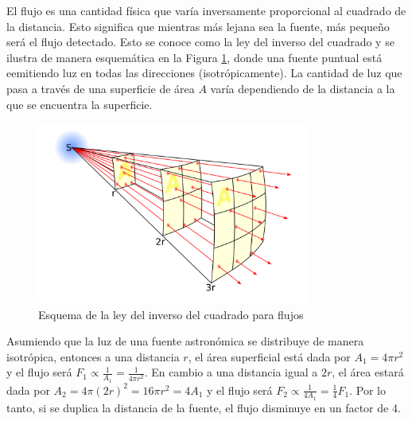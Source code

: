 El flujo es una cantidad física que varía inversamente proporcional al cuadrado de la distancia. Esto significa que mientras más lejana sea la fuente, más pequeño será el flujo detectado. Esto se conoce como la ley del inverso del cuadrado y se ilustra de manera esquemática en la Figura \ref{fig:flux-inverse}, donde una fuente puntual está eemitiendo luz en todas las direcciones (isotrópicamente). La cantidad de luz que pasa a través de una superficie de área $A$ varía dependiendo de la distancia a la que se encuentra la superficie. 

\begin{figure}[htb]
  \centering
  \includegraphics[width=0.8\textwidth]{figures/Inverse_square_law.png}
  \caption{Esquema de la ley del inverso del cuadrado para flujos}
  \label{fig:flux-inverse}
\end{figure}

Asumiendo que la luz de una fuente astronómica se distribuye de manera isotrópica, entonces a una distancia $ r $, el área superficial está dada por $ A_1 = 4\pi r^2 $ y el flujo será $ F_1 \propto \frac{1}{A_1} = \frac{1}{4\pi r^2} $. En cambio a una distancia igual a $ 2r $, el área estará dada por $ A_2 = 4\pi (2r)^2 = 16 \pi r^2 = 4A_1 $ y el flujo será $ F_2 \propto \frac{1}{4A_1}  = \frac{1}{4}F_1$. Por lo tanto, si se duplica la distancia de la fuente, el flujo disminuye en un factor de 4. 

